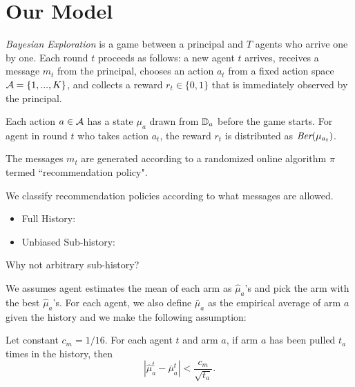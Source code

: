 \section{Our Model}
\label{sec:model}

\emph{Bayesian Exploration} is a game between a principal and $T$ agents who arrive one by one. Each round $t$ proceeds as follows: a new agent $t$ arrives, receives a message $m_t$ from the principal, chooses an action $a_t$ from a fixed action space $\mathcal{A} = \{1,...,K\}$, and collects a reward $r_t\in \{0,1\}$ that is immediately observed by the principal. 

Each action $a \in \mathcal{A}$ has a state $\mu_a$ drawn from $\mathbb{D}_a$ before the game starts. For agent in round $t$ who takes action $a_t$, the reward $r_t$ is distributed as $\emph{Ber}(\mu_{a_t})$.  

The messages $m_t$ are generated according to a randomized online algorithm $\pi$ termed ``recommendation policy".

 We classify recommendation policies according to what messages are allowed. 
\begin{itemize}
\item Full History: 
\item Unbiased Sub-history: 
\end{itemize}

\begin{remark}
Why not arbitrary sub-history?
\end{remark}

 We assumes agent estimates the mean of each arm as $\hat{\mu}_a$'s and pick the arm with the best $\hat{\mu}_a$'s. For each agent, we also define $\bar{\mu}_a$ as the empirical average of arm $a$ given the history and we make the following assumption:
\begin{assumption}
\label{ass:embehave}
Let constant $c_m = 1/16$. For each agent $t$ and arm $a$, if arm $a$ has been pulled $t_a$ times in the history, then
\[
|\hat{\mu}^t_a - \bar{\mu}^t_a | < \frac{c_m}{\sqrt{t_a}}.
\]
\end{assumption}


